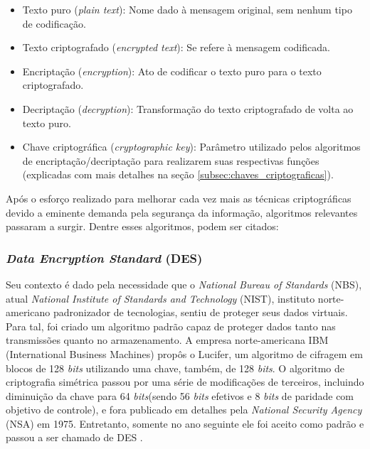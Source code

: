 \documentclass[12pt]{article}
\newcommand{\bits}{\textit{bits}\xspace}
\begin{document}
            \begin{itemize}
                \item Texto puro (\textit{plain text}):
                Nome dado à mensagem original, sem nenhum tipo de codificação.
                
                \item Texto criptografado (\textit{encrypted text}):
                Se refere à mensagem codificada.
                
                \item Encriptação (\textit{encryption}):
                Ato de codificar o texto puro para o texto criptografado.
                
                \item Decriptação (\textit{decryption}):
                Transformação do texto criptografado de volta ao texto puro.
                
                \item Chave criptográfica (\textit{cryptographic key}):
                Parâmetro utilizado pelos algoritmos de encriptação/decriptação para realizarem suas respectivas funções (explicadas com mais detalhes na seção \ref{subsec:chaves_criptograficas}).
                
            \end{itemize}
                
            Após o esforço realizado para melhorar cada vez mais as técnicas criptográficas devido a eminente demanda pela segurança da informação, algoritmos relevantes passaram a surgir. Dentre esses algoritmos, podem ser citados:
            
            \subsubsection{\textit{Data Encryption Standard} (DES)}
            \label{subsubsec:des}
                
                Seu contexto é dado pela necessidade que o \textit{National Bureau of Standards} (NBS), atual \textit{National Institute of Standards and Technology} (NIST), instituto norte-americano padronizador de tecnologias, sentiu de proteger seus dados virtuais. Para tal, foi criado um algoritmo padrão capaz de proteger dados tanto nas transmissões quanto no armazenamento. A empresa norte-americana IBM (International Business Machines) propôs o Lucifer, um algoritmo de cifragem em blocos de 128 \bits utilizando uma chave, também, de 128 \bits \cite{terada2000seguranca}. O algoritmo de criptografia simétrica passou por uma série de modificações de terceiros, incluindo diminuição da chave para 64 \bits (sendo 56 \bits efetivos e 8 \bits de paridade com objetivo de controle), e fora publicado em detalhes pela \textit{National Security Agency} (NSA) em 1975. Entretanto, somente no ano seguinte ele foi aceito como padrão e passou a ser chamado de DES \cite{grabbe1992algorithm}.
                
\end{document}
